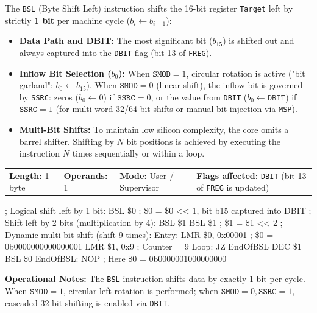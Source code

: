 \documentclass[11pt,a4paper]{article}
\newcommand{\reg}{\$}
\begin{document}
\begin{instructiondesc}[title={Detailed Description and Microcode Semantics},top=3pt,bottom=3pt]
The \texttt{BSL} (Byte Shift Left) instruction shifts the 16-bit register \texttt{Target} left by strictly \textbf{1 bit} per machine cycle (\(b_i \leftarrow b_{i-1}\)):
\begin{itemize}[leftmargin=10pt,itemsep=1pt,topsep=1pt]
    \item \textbf{Data Path and DBIT:} The most significant bit (\(b_{15}\)) is shifted out and always captured into the \texttt{DBIT} flag (bit 13 of \texttt{FREG}).
    \item \textbf{Inflow Bit Selection (\(b_0\)):} When \(\texttt{SMOD}=1\), circular rotation is active ("bit garland": \(b_0 \leftarrow b_{15}\)). When \(\texttt{SMOD}=0\) (linear shift), the inflow bit is governed by \texttt{SSRC}: zeros (\(b_0 \leftarrow 0\)) if \(\texttt{SSRC}=0\), or the value from \texttt{DBIT} (\(b_0 \leftarrow \texttt{DBIT}\)) if \(\texttt{SSRC}=1\) (for multi-word 32/64-bit shifts or manual bit injection via \texttt{MSP}).
    \item \textbf{Multi-Bit Shifts:} To maintain low silicon complexity, the core omits a barrel shifter. Shifting by \(N\) bit positions is achieved by executing the instruction \(N\) times sequentially or within a loop.
\end{itemize}
\end{instructiondesc}

\begin{tcolorbox}[
    enhanced,
    colback=limcard,
    colframe=limborder,
    boxrule=0.6pt,
    arc=3pt,
    left=8pt,right=8pt,top=3pt,bottom=3pt
]
    \footnotesize
    \noindent
    \begin{tabularx}{\textwidth}{@{}l l l X@{}}
        \textbf{Length:} 1 byte &
        \textbf{Operands:} 1 &
        \textbf{Mode:} User / Supervisor &
        \textbf{Flags affected:} \texttt{DBIT} (bit 13 of \texttt{FREG} is updated)
    \end{tabularx}
\end{tcolorbox}

\begin{examplebox}[title={Usage Example (LIM2 Assembly)},top=3pt,bottom=3pt]
\begin{limasm}
; Logical shift left by 1 bit:
BSL  \reg0                  ; \reg0 = \reg0 << 1, bit b15 captured into DBIT
; Shift left by 2 bits (multiplication by 4):
BSL  \reg1
BSL  \reg1                  ; \reg1 = \reg1 << 2
; Dynamic multi-bit shift (shift 9 times):
Entry:
    LMR \reg0, 0x00001      ; \reg0 = 0b0000000000000001
    LMR \reg1, 0x9          ; Counter = 9
Loop:
    JZ  EndOfBSL
    DEC \reg1
    BSL \reg0
EndOfBSL:
    NOP                     ; Here \reg0 = 0b0000001000000000
\end{limasm}
\vspace{0.5mm}
\footnotesize\color{limmuted}
\textbf{Operational Notes:} The \texttt{BSL} instruction shifts data by exactly 1 bit per cycle. When \(\texttt{SMOD}=1\), circular left rotation is performed; when \(\texttt{SMOD}=0, \texttt{SSRC}=1\), cascaded 32-bit shifting is enabled via \texttt{DBIT}.
\end{examplebox}
\end{document}
